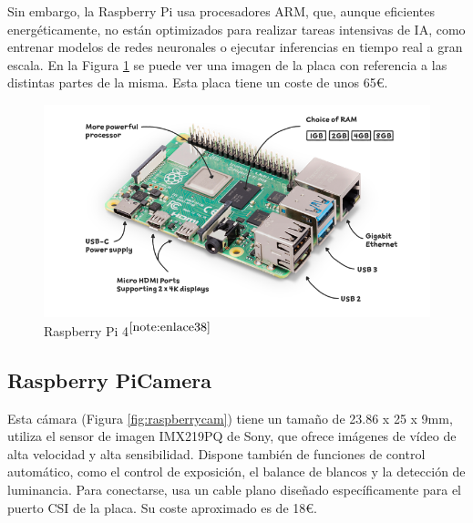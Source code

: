  Sin embargo, la Raspberry Pi usa procesadores ARM, que, aunque eficientes energéticamente, no están optimizados para realizar tareas intensivas de \ac{IA}, como entrenar modelos de redes neuronales o ejecutar inferencias en tiempo real a gran escala. En la Figura \ref{fig:raspberry} se puede ver una imagen de la placa con referencia a las distintas partes de la misma. Esta placa tiene un coste de unos 65€. 


\begin{figure} [h!]
	\begin{center}
		\includegraphics[width=14cm]{figs/raspberrypi4.png}
	\end{center}
	\caption{Raspberry Pi 4$^{\ref{note:enlace38}}$} 
\label{fig:raspberry}
\end{figure}

\setcounter{footnote}{38} %

\subsection{Raspberry PiCamera}

Esta cámara (Figura \ref{fig:raspberrycam}) tiene un tamaño de  23.86 x 25 x 9mm, utiliza el sensor de imagen IMX219PQ de Sony, que ofrece imágenes de vídeo de alta velocidad y alta sensibilidad. Dispone también de funciones de control automático, como el control de exposición, el balance de blancos y la detección de luminancia. Para conectarse, usa un cable plano diseñado específicamente para el puerto \ac{CSI} de la placa. Su coste aproximado es de 18€. 



